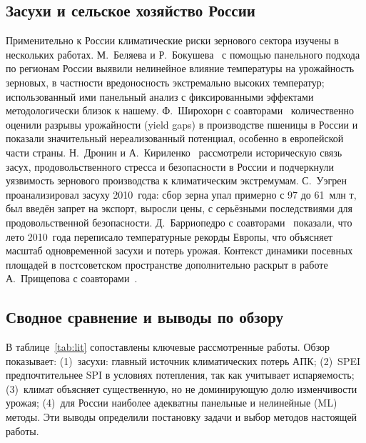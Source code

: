 \documentclass[14pt,a4paper]{extarticle}
\begin{document}
\subsection{Засухи и сельское хозяйство России}

Применительно к России климатические риски зернового сектора изучены в нескольких работах. М.~Беляева и Р.~Бокушева~\cite{belyaeva2018} с помощью панельного подхода по регионам России выявили нелинейное влияние температуры на урожайность зерновых, в частности вредоносность экстремально высоких температур; использованный ими панельный анализ с фиксированными эффектами методологически близок к нашему. Ф.~Широхорн с соавторами~\cite{schierhorn2014} количественно оценили разрывы урожайности (yield gaps) в производстве пшеницы в России и показали значительный нереализованный потенциал, особенно в европейской части страны. Н.~Дронин и А.~Кириленко~\cite{dronin2011} рассмотрели историческую связь засух, продовольственного стресса и безопасности в России и подчеркнули уязвимость зернового производства к климатическим экстремумам. С.~Уэгрен~\cite{wegren2011} проанализировал засуху 2010~года: сбор зерна упал примерно с 97 до 61~млн т, был введён запрет на экспорт, выросли цены, с серьёзными последствиями для продовольственной безопасности. Д.~Барриопедро с соавторами~\cite{barriopedro2011} показали, что лето 2010~года переписало температурные рекорды Европы, что объясняет масштаб одновременной засухи и потерь урожая. Контекст динамики посевных площадей в постсоветском пространстве дополнительно раскрыт в работе А.~Прищепова с соавторами~\cite{prishchepov2021}.

\subsection{Сводное сравнение и выводы по обзору}

В таблице~\ref{tab:lit} сопоставлены ключевые рассмотренные работы. Обзор показывает: (1)~засухи: главный источник климатических потерь АПК; (2)~SPEI предпочтительнее SPI в условиях потепления, так как учитывает испаряемость; (3)~климат объясняет существенную, но не доминирующую долю изменчивости урожая; (4)~для России наиболее адекватны панельные и нелинейные (ML) методы. Эти выводы определили постановку задачи и выбор методов настоящей работы.
\end{document}
